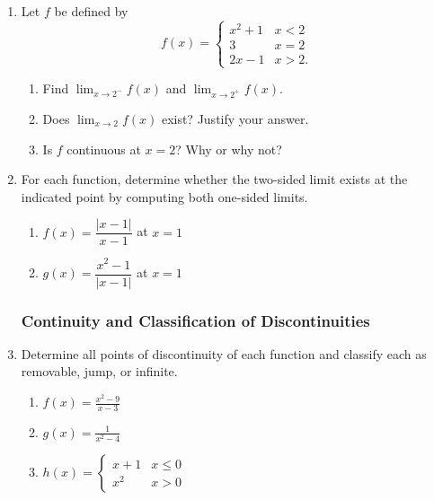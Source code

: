\begin{enumerate}
\subsubsection*{One-Sided Limits}

\item Let $f$ be defined by
      \[
        f(x) =
        \begin{cases}
          x^2 + 1 & x < 2 \\
          3       & x = 2 \\
          2x - 1  & x > 2.
        \end{cases}
      \]
      \begin{enumerate}
        \item Find $\displaystyle\lim_{x \to 2^-} f(x)$ and
              $\displaystyle\lim_{x \to 2^+} f(x)$.
        \item Does $\displaystyle\lim_{x \to 2} f(x)$ exist?
              Justify your answer.
        \item Is $f$ continuous at $x = 2$? Why or why not?
      \end{enumerate}

\item For each function, determine whether the two-sided limit
      exists at the indicated point by computing both one-sided
      limits.
      \begin{enumerate}
        \item $f(x) = \dfrac{|x - 1|}{x - 1}$ at $x = 1$
        \item $g(x) = \dfrac{x^2 - 1}{|x - 1|}$ at $x = 1$
      \end{enumerate}

\subsubsection*{Continuity and Classification of Discontinuities}

\item Determine all points of discontinuity of each function
      and classify each as removable, jump, or infinite.
      \begin{enumerate}
        \item $\displaystyle f(x) = \frac{x^2 - 9}{x - 3}$
        \item $\displaystyle g(x) = \frac{1}{x^2 - 4}$
        \item $\displaystyle h(x) =
              \begin{cases} x + 1 & x \leq 0 \\ x^2 & x > 0 \end{cases}$
      \end{enumerate}


\end{enumerate}
